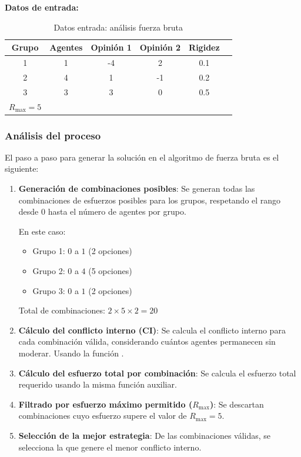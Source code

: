 \documentclass[11pt,letter]{article}
\begin{document}
\textbf{Datos de entrada:}

\begin{table}[ht]
\centering
\begin{tabular}{cccccc}
\toprule
\textbf{Grupo} & \textbf{Agentes} & \textbf{Opinión 1} & \textbf{Opinión 2} & \textbf{Rigidez} \\
\midrule
1 & 1 & -4 & 2 & 0.1 \\
2 & 4 & 1 & -1 & 0.2 \\
3 & 3 & 3 & 0 & 0.5 \\
\bottomrule
$R_{\text{max}} = 5$
\end{tabular}
\caption{Datos entrada: análisis fuerza bruta}
\end{table}


\subsubsection*{Análisis del proceso}
El paso a paso para generar la solución en el algoritmo de fuerza bruta es el siguiente:
\begin{enumerate}
    \item \textbf{Generación de combinaciones posibles}: Se generan todas las combinaciones de esfuerzos posibles para los grupos, respetando el rango desde 0 hasta el número de agentes por grupo.
    
    En este caso:
    \begin{itemize}
        \item Grupo 1: $0$ a $1$ (2 opciones)
        \item Grupo 2: $0$ a $4$ (5 opciones)
        \item Grupo 3: $0$ a $1$ (2 opciones)
    \end{itemize}

    Total de combinaciones: $2 \times 5 \times 2 = 20$

    \item \textbf{Cálculo del conflicto interno (CI)}: Se calcula el conflicto interno para cada combinación válida, considerando cuántos agentes permanecen sin moderar. Usando la función .
    \item \textbf{Cálculo del esfuerzo total por combinación}: Se calcula el esfuerzo total requerido usando la misma función auxiliar.
    
    \item \textbf{Filtrado por esfuerzo máximo permitido ($R_{\text{max}}$)}: Se descartan combinaciones cuyo esfuerzo supere el valor de $R_{\text{max}} = 5$.

    \item \textbf{Selección de la mejor estrategia}: De las combinaciones válidas, se selecciona la que genere el menor conflicto interno.
\end{enumerate}
\end{document}
